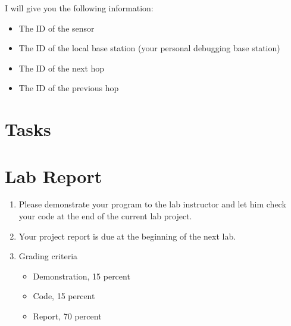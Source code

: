 \documentclass[letterpaper,12pt]{article}
\begin{document}
I will give you the following information:
\begin{itemize}
    \item The ID of the sensor
    \item The ID of the local base station (your personal debugging base station)
    \item The ID of the next hop
    \item The ID of the previous hop
\end{itemize}

\section*{Tasks}

\section*{Lab Report}
\begin{enumerate}
   \item Please demonstrate your program to the lab instructor and let him check your code at the end of the current lab project.
   \item Your project report is due at the beginning of the next lab.
   \item Grading criteria
      \begin{itemize}
         \item Demonstration, 15 percent
         \item Code, 15 percent
         \item Report, 70 percent
      \end{itemize}
\end{enumerate}
\end{document}
